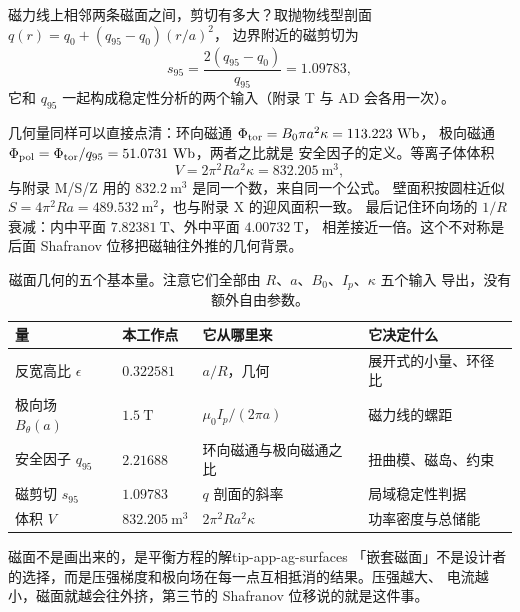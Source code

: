 磁力线上相邻两条磁面之间，剪切有多大？取抛物线型剖面 $q(r)=q_0+(q_{95}-q_0)(r/a)^2$，
边界附近的磁剪切为
\begin{equation}
s_{95} = \frac{2(q_{95}-q_0)}{q_{95}} = 1.09783,
\label{eq:app-ag-shear}
\end{equation}
它和 $q_{95}$ 一起构成稳定性分析的两个输入（附录 T 与 AD 会各用一次）。

几何量同样可以直接点清：环向磁通 $\Phi_{\rm tor}=B_0\pi a^2\kappa = 113.223\ \mathrm{Wb}$，
极向磁通 $\Phi_{\rm pol}=\Phi_{\rm tor}/q_{95}=51.0731\ \mathrm{Wb}$，两者之比就是
安全因子的定义。等离子体体积
\begin{equation}
V = 2\pi^2 R a^2 \kappa = 832.205\ \mathrm{m^3},
\label{eq:app-ag-volume}
\end{equation}
与附录 M/S/Z 用的 $832.2\ \mathrm{m^3}$ 是同一个数，来自同一个公式。
壁面积按圆柱近似 $S=4\pi^2 R a = 489.532\ \mathrm{m^2}$，也与附录 X 的迎风面积一致。
最后记住环向场的 $1/R$ 衰减：内中平面 $7.82381\ \mathrm{T}$、外中平面 $4.00732\ \mathrm{T}$，
相差接近一倍。这个不对称是后面 Shafranov 位移把磁轴往外推的几何背景。

\begin{table}[htbp]
\centering
\small
\caption{磁面几何的五个基本量。注意它们全部由 $R$、$a$、$B_0$、$I_p$、$\kappa$ 五个输入
导出，没有额外自由参数。}
\label{tab:app-ag-scales}
\begin{tabular}{p{3.4cm}p{2.9cm}p{4.2cm}p{4.4cm}}
\toprule
量 & 本工作点 & 它从哪里来 & 它决定什么 \\
\midrule
反宽高比 $\epsilon$ & $0.322581$ & $a/R$，几何 & 展开式的小量、环径比 \\
极向场 $B_\theta(a)$ & $1.5\ \mathrm{T}$ & $\mu_0 I_p/(2\pi a)$ & 磁力线的螺距 \\
安全因子 $q_{95}$ & $2.21688$ & 环向磁通与极向磁通之比 & 扭曲模、磁岛、约束 \\
磁剪切 $s_{95}$ & $1.09783$ & $q$ 剖面的斜率 & 局域稳定性判据 \\
体积 $V$ & $832.205\ \mathrm{m^3}$ & $2\pi^2 R a^2 \kappa$ & 功率密度与总储能 \\
\bottomrule
\end{tabular}

\end{table}

\begin{tip}{磁面不是画出来的，是平衡方程的解}{tip-app-ag-surfaces}
「嵌套磁面」不是设计者的选择，而是压强梯度和极向场在每一点互相抵消的结果。压强越大、
电流越小，磁面就越会往外挤，第三节的 Shafranov 位移说的就是这件事。
\end{tip}

